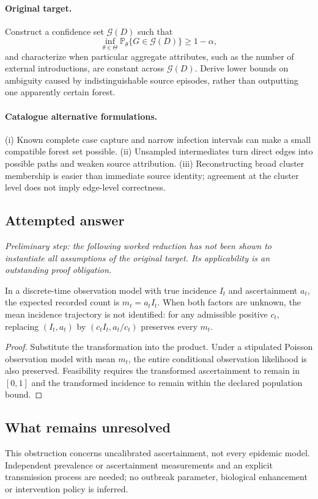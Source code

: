 \documentclass[11pt]{article}
\begin{document}
\paragraph{Original target.}
Construct a confidence set $\mathcal G(D)$ such that
    \[\inf_{\theta\in\Theta}\mathbb{P}_\theta\{G\in\mathcal G(D)\}\geq1-\alpha,\]
    and characterize when particular aggregate attributes, such as the number of external introductions, are constant across $\mathcal G(D)$. Derive lower bounds on ambiguity caused by indistinguishable source episodes, rather than outputting one apparently certain forest.
\paragraph{Catalogue alternative formulations.}
(i) Known complete case capture and narrow infection intervals can make a small compatible forest set possible. (ii) Unsampled intermediates turn direct edges into possible paths and weaken source attribution. (iii) Reconstructing broad cluster membership is easier than immediate source identity; agreement at the cluster level does not imply edge-level correctness.
\subsection{Attempted answer}
\noindent\emph{Preliminary step: the following worked reduction has not been shown to instantiate all assumptions of the original target. Its applicability is an outstanding proof obligation.}

\begin{proposition}
In a discrete-time observation model with true incidence $I_t$ and ascertainment $a_t$, the expected recorded count is $m_t=a_tI_t$. When both factors are unknown, the mean incidence trajectory is not identified: for any admissible positive $c_t$, replacing $(I_t,a_t)$ by $(c_tI_t,a_t/c_t)$ preserves every $m_t$.
\end{proposition}
\begin{proof}
Substitute the transformation into the product. Under a stipulated Poisson observation model with mean $m_t$, the entire conditional observation likelihood is also preserved. Feasibility requires the transformed ascertainment to remain in $[0,1]$ and the transformed incidence to remain within the declared population bound.
\end{proof}
\subsection{What remains unresolved}
This obstruction concerns uncalibrated ascertainment, not every epidemic model. Independent prevalence or ascertainment measurements and an explicit transmission process are needed; no outbreak parameter, biological enhancement or intervention policy is inferred.
\end{document}
